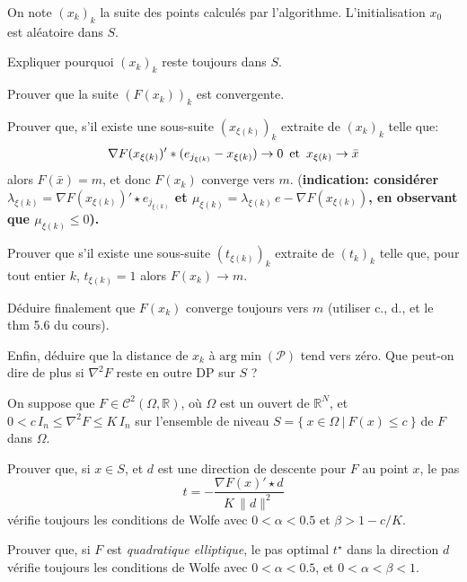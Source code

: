 \documentclass[12pt,a4paper,fleqn]{report}
\newcommand{\R}{\mathbb R}
\newcommand{\grad}{\nabla}
\newcommand{\hess}{\nabla^2}
\renewcommand{\P}{\mathcal P}
\newcommand{\push}[1]{\rule{0pt}{0pt}\hspace{#1pt}}
\begin{document}
\begin{exercice}
\begin{questions}
On note $(x_k)_k$ la suite des points calcul\'es par l'algorithme. L'initialisation $x_0$ est al\'eatoire dans $S$. 
\begin{subquestions}
\item Expliquer pourquoi $(x_k)_k$ reste toujours dans $S$.
\item Prouver que la suite $(F(x_k))_k$ est convergente.
\item Prouver que, s'il existe une sous-suite $(x_{\xi(k)})_k$ extraite de $(x_k)_k$ telle que: 
\[
\grad F(x_{\xi(k)})'*(e_{j_{\xi(k)}}-x_{\xi(k)})\rightarrow 0 \push{5} \mbox{et}\push{5} x_{\xi(k)}\rightarrow \bar x
\]
 alors $F(\bar x)=m$, et donc $F(x_k)$ converge vers $m$. (\bf indication\rm : consid\'erer $\lambda_{\xi(k)}= \grad F(x_{\xi(k)})'\star e_{j_{\xi(k)}}$ et $\mu_{\xi(k)}=\lambda_{\xi(k)}\,e-\grad F(x_{\xi(k)})$, en observant que $\mu_{\xi(k)}\leq 0$).
\item Prouver que s'il existe une sous-suite $(t_{\xi(k)})_k$ extraite de $(t_k)_k$ telle que, pour tout entier $k$, $t_{\xi(k)}=1$ alors \mbox{$F(x_k)\rightarrow m$}.
\item D\'eduire finalement que $F(x_k)$ converge toujours vers $m$ (utiliser c., d., et le thm 5.6 du cours).
\item Enfin, d\'eduire que la distance de $x_k$ \`a $\mbox{arg} \min (\P)$ tend vers z\'ero. Que peut-on dire de plus si $\hess F$ reste en outre DP sur $S$ ?
\end{subquestions}
\end{questions}
\end{exercice}

\begin{exercice} On suppose que $F\in \mathcal C^2(\Omega,\R)$, o\`u $\Omega$ est un ouvert de $\R^N$, et $0<c\,I_n\leq \hess F\leq K\,I_n$
sur l'ensemble de niveau $S=\{ \ x\in \Omega\ | \ F(x)\leq c\ \}$ de $F$ dans $\Omega$. 
\begin{questions}
\item Prouver que, si $x\in S$, et $d$ est une direction de descente pour $F$ au point $x$, le pas
\[
t=-\frac{\grad F(x)'\star d}{K\,\|d\|^2}
\]
v\'erifie toujours les conditions de Wolfe avec $0<\alpha<0.5$ et $\beta>1-c/K$.
\item Prouver que, si $F$ est \textit{quadratique elliptique}, le pas optimal $t^{\star}$ dans la direction $d$ v\'erifie toujours les conditions de Wolfe avec $0<\alpha<0.5$, et $0<\alpha<\beta<1$.
\end{questions}
\end{exercice}
\end{document}
